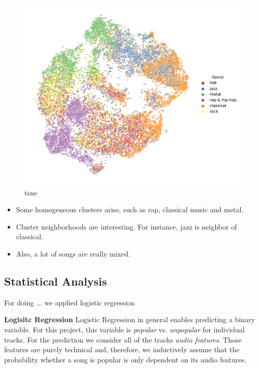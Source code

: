 \documentclass{article}
\begin{document}
\begin{figure}
  \centering
  \includegraphics[width=\textwidth]{../figures/tsne_genres.pdf}
  \caption{tsne}
  \label{fig:tsne_genres}
\end{figure}

\begin{itemize}
  \item Some homogeneous clusters arise, such as rap, classical music and metal. 
  \item Cluster neighborhoods are interesting. For instance, jazz is neighbor of classical.
  \item Also, a lot of songs are really mixed.
\end{itemize}

\subsection{Statistical Analysis}
For doing ... we applied logistic regression

\textbf{Logisitc Regression}
Logistic Regression in general enables predicting a binary variable. 
For this project, this variable is \textit{popular} vs. \textit{unpopular} for individual tracks.
For the prediction we consider all of the tracks \textit{audio features}. 
Those features are purely technical and, therefore, we inductively assume that the probability whether a song is popular is only dependent on its audio features. 
\end{document}
